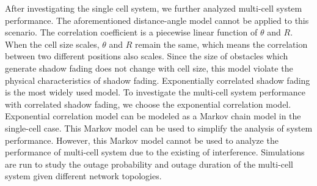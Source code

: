 \par After investigating the single cell system, we further analyzed multi-cell system performance. The aforementioned distance-angle model cannot be applied to this scenario. The correlation coefficient is a piecewise linear function of $\theta$ and $R$.  When the cell size scales, $\theta$ and $R$ remain the same, which means the correlation between two different positions also scales. Since the size of obstacles which generate shadow fading does not change with cell size, this model violate the physical characteristics of shadow fading. Exponentially correlated shadow fading is the most widely used model. To investigate the multi-cell system performance with correlated shadow fading, we choose the exponential correlation model. Exponential correlation model can be modeled as a Markov chain model in the single-cell case. This Markov model can be used to simplify the analysis of system performance. However, this Markov model cannot be used to analyze the performance of multi-cell system due to the existing of interference. Simulations are run to study the outage probability and outage duration of the multi-cell system given different network topologies. 



